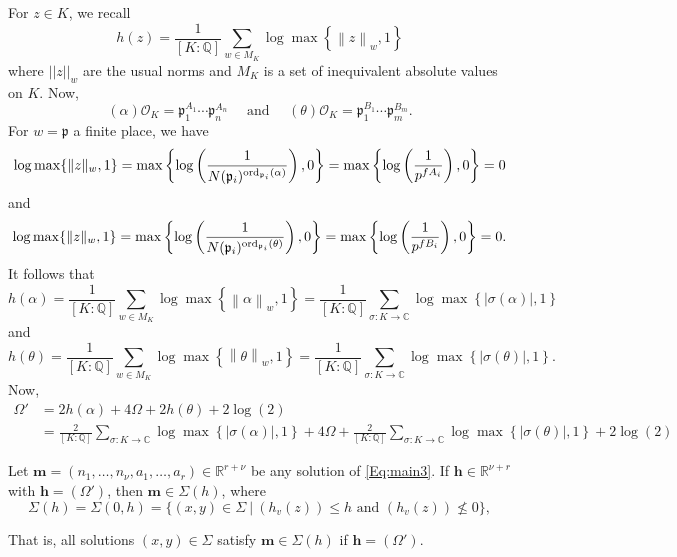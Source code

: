 For $z \in K$, we recall
\[h(z)=\frac{1}{[K:\mathbb{Q}]}\sum_{w \in M_K} \log \max \left\{ \left\|z\right\|_{w}, 1\right\}\]
where $||z||_w$ are the usual norms and $M_K$ is a set of inequivalent absolute values on $K$. Now, 
\[(\alpha)\mathcal{O}_K = \mathfrak{p}_1^{A_1} \cdots \mathfrak{p}_n^{A_n} \quad \text{ and } \quad (\theta)\mathcal{O}_K = \mathfrak{p}_1^{B_1} \cdots \mathfrak{p}_m^{B_m}.\]
For $w = \mathfrak{p}$ a finite place, we have
\[ \log \max \{ \|z\|_{w}, 1\} = \max \left\{ \log\left(\frac{1}{N(\mathfrak{p}_i)^{\operatorname{ord}_{\mathfrak{p}_i}(\alpha)}} \right), 0\right\} = \max \left\{ \log\left(\frac{1}{p^{fA_i}} \right), 0\right\} = 0\]
and 
\[ \log \max \{ \|z\|_{w}, 1\} = \max \left\{ \log\left(\frac{1}{N(\mathfrak{p}_i)^{\operatorname{ord}_{\mathfrak{p}_i}(\theta)}} \right), 0\right\} = \max \left\{ \log\left(\frac{1}{p^{fB_i}} \right), 0\right\} = 0.\]
It follows that
\[h(\alpha)=\frac{1}{[K:\mathbb{Q}]}\sum_{w \in M_K} \log \max \left\{ \left\|\alpha\right\|_{w}, 1\right\}
	= \frac{1}{[K:\mathbb{Q}]}\sum_{\sigma:K \to \mathbb{C}} \log \max \left\{ |\sigma(\alpha)|, 1\right\}
\]
and 
\[h(\theta)=\frac{1}{[K:\mathbb{Q}]}\sum_{w \in M_K} \log \max \left\{ \left\|\theta\right\|_{w}, 1\right\}
	= \frac{1}{[K:\mathbb{Q}]}\sum_{\sigma:K \to \mathbb{C}} \log \max \left\{ |\sigma(\theta)|, 1\right\}.
\]
Now, 
\begin{align*}
\Omega'	
	& = 2h(\alpha) + 4\Omega + 2h(\theta) + 2\log(2)\\
	& = \frac{2}{[K:\mathbb{Q}]}\sum_{\sigma:K \to \mathbb{C}} \log \max \left\{ |\sigma(\alpha)|, 1\right\} + 4\Omega + \frac{2}{[K:\mathbb{Q}]}\sum_{\sigma:K \to \mathbb{C}} \log \max \left\{ |\sigma(\theta)|, 1\right\} + 2\log(2)
\end{align*}

\begin{lemma}
Let ${\mathbf{m} = (n_1, \dots, n_{\nu}, a_1, \dots, a_r) \in \mathbb{R}^{r + \nu}}$ be any solution of \eqref{Eq:main3}. If $\mathbf{h} \in\mathbb{R}^{\nu + r}$ with $\mathbf{h} = (\Omega')$, then $\mathbf{m}\in \Sigma(h)$, where
\[\Sigma(h) = \Sigma(0,h)= \{(x,y) \in \Sigma \ | \ (h_v(z))\leq h \text{ and }  (h_v(z))\nleq 0 \},\]
\end{lemma}
That is, all solutions $(x,y) \in \Sigma$ satisfy $\mathbf{m}\in \Sigma(h)$ if $\mathbf{h} = (\Omega')$.

